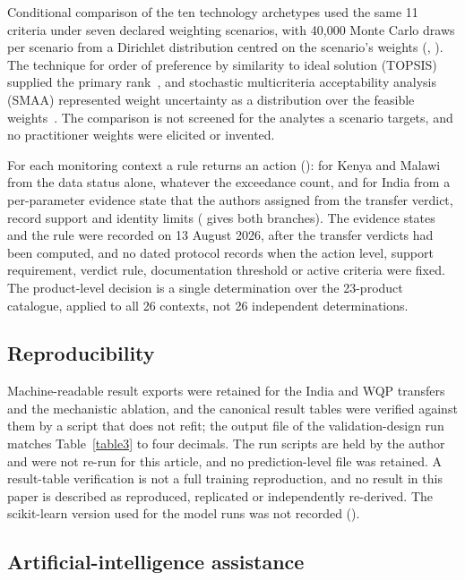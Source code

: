 \documentclass[10pt,letterpaper]{article}
\begin{document}
Conditional comparison of the ten technology archetypes used the same 11 criteria under seven declared weighting scenarios, with 40,000 Monte Carlo draws per scenario from a Dirichlet distribution centred on the scenario's weights (, ). The technique for order of preference by similarity to ideal solution (TOPSIS) supplied the primary rank~\cite{Chakraborty2022}, and stochastic multicriteria acceptability analysis (SMAA) represented weight uncertainty as a distribution over the feasible weights~\cite{TervonenLahdelma2007}. The comparison is not screened for the analytes a scenario targets, and no practitioner weights were elicited or invented.

For each monitoring context a rule returns an action (): for Kenya and Malawi from the data status alone, whatever the exceedance count, and for India from a per-parameter evidence state that the authors assigned from the transfer verdict, record support and identity limits ( gives both branches). The evidence states and the rule were recorded on 13 August 2026, after the transfer verdicts had been computed, and no dated protocol records when the action level, support requirement, verdict rule, documentation threshold or active criteria were fixed. The product-level decision is a single determination over the 23-product catalogue, applied to all 26 contexts, not 26 independent determinations.

\subsection*{Reproducibility}

Machine-readable result exports were retained for the India and WQP transfers and the mechanistic ablation, and the canonical result tables were verified against them by a script that does not refit; the output file of the validation-design run matches Table~\ref{table3} to four decimals. The run scripts are held by the author and were not re-run for this article, and no prediction-level file was retained. A result-table verification is not a full training reproduction, and no result in this paper is described as reproduced, replicated or independently re-derived. The scikit-learn version used for the model runs was not recorded ().

\subsection*{Artificial-intelligence assistance}
\end{document}
